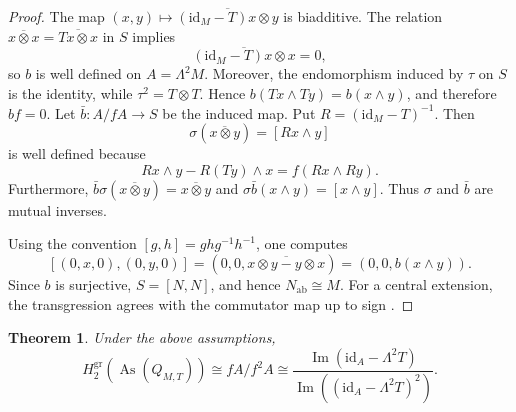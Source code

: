 \documentclass[11pt]{article}
\newtheorem{theorem}{Theorem}[section]
\DeclareMathOperator{\As}{As}
\newcommand{\gr}{\mathrm{gr}}
\newcommand{\ab}{\mathrm{ab}}
\begin{document}
\begin{proof}
The map
$(x,y)\mapsto\overline{(\mathrm{id}_M-T)x\otimes y}$ is biadditive. The
relation $\overline{x\otimes x}=\overline{Tx\otimes x}$ in $S$ implies
\[
 \overline{(\mathrm{id}_M-T)x\otimes x}=0,
\]
so $b$ is well defined on $A=\Lambda^2M$. Moreover, the endomorphism induced
by $\tau$ on $S$ is the identity, while $\tau^2=T\otimes T$. Hence
$b(Tx\wedge Ty)=b(x\wedge y)$, and therefore $bf=0$. Let
$\bar b\colon A/fA\to S$ be the induced map. Put
$R=(\mathrm{id}_M-T)^{-1}$. Then
\[
 \sigma(\overline{x\otimes y})=[Rx\wedge y]
\]
is well defined because
\[
 Rx\wedge y-R(Ty)\wedge x=f(Rx\wedge Ry).
\]
Furthermore,
$\bar b\sigma(\overline{x\otimes y})=\overline{x\otimes y}$ and
$\sigma\bar b(x\wedge y)=[x\wedge y]$. Thus $\sigma$ and $\bar b$ are
mutual inverses.

Using the convention $[g,h]=ghg^{-1}h^{-1}$, one computes
\[
 [(0,x,0),(0,y,0)]
 =(0,0,\overline{x\otimes y-y\otimes x})
 =(0,0,b(x\wedge y)).
\]
Since $b$ is surjective, $S=[N,N]$, and hence $N_{\ab}\cong M$. For a
central extension, the transgression agrees with the commutator map up to
sign \cite[Chapter~VII, \S6]{Brown}.
\end{proof}

\begin{theorem}
\label{thm:alexander-h2-associated}
Under the above assumptions,
\[
H_2^{\gr}(\As(Q_{M,T}))
        \cong fA/f^2A
        \cong
        \frac{\operatorname{Im}(\mathrm{id}_A-\Lambda^2T)}
        {\operatorname{Im}((\mathrm{id}_A-\Lambda^2T)^2)}.
\]
\end{theorem}
\end{document}
